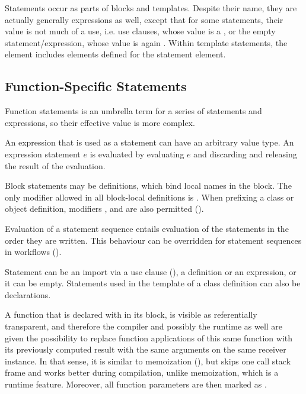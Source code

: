Statements occur as parts of blocks and templates. Despite their name, they are actually generally expressions as well, except that for some statements, their value is not much of a use, i.e. use clauses, whose value is a \code{()}, or the empty statement/expression, whose value is again \code{()}. Within template statements, the  element includes elements defined for the statement element. 






\subsection{Function-Specific Statements}

Function statements is an umbrella term for a series of statements and expressions, so their effective value is more complex. 

An expression that is used as a statement can have an arbitrary value type. An expression statement $e$ is evaluated by evaluating $e$ and discarding and releasing the result of the evaluation. 

Block statements may be definitions, which bind local names in the block. The only modifier allowed in all block-local definitions is . When prefixing a class or object definition, modifiers ,  and  are also permitted ().

Evaluation of a statement sequence entails evaluation of the statements in the order they are written. This behaviour can be overridden for statement sequences in workflows ().

Statement can be an import via a use clause (), a definition or an expression, or it can be empty. Statements used in the template of a class definition can also be declarations. 

A function that is declared with  in its  block, is visible as referentially transparent, and therefore the compiler and possibly the runtime as well are given the possibility to replace function applications of this same function with its previously computed result with the same arguments on the same receiver instance. In that sense, it is similar to memoization (), but skips one call stack frame and works better during compilation, unlike memoization, which is a runtime feature. Moreover, all function parameters are then marked as . 

